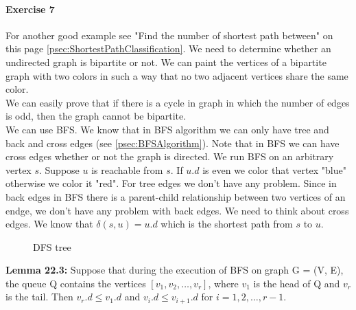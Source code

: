 \documentclass{book}
\begin{document}
    \label{psec:bfs_exercise_7}
	\paragraph{Exercise 7}
	For another good example see "Find the number of shortest path between" on this page \ref{psec:ShortestPathClassification}. We need to determine whether an undirected graph is bipartite or not. We can paint the vertices of a bipartite graph with two colors in such a way that no two adjacent vertices share the same color.\\
	We can easily prove that if there is a cycle in graph in which the number of edges is odd, then the graph cannot be bipartite. \\
	We can use BFS. We know that in BFS algorithm we can only have tree and back and cross edges (see \ref{psec:BFSAlgorithm}). Note that in BFS we can have cross edges whether or not the graph is directed. We run BFS on an arbitrary vertex $s$. Suppose $u$ is reachable from $s$. If $u.d$ is even we color that vertex "blue" otherwise we color it "red". For tree edges we don't have any problem. Since in back edges in BFS there is a parent-child relationship between two vertices of an endge, we don't have any problem with back edges. We need to think about cross edges. We know that $\delta(s, u) = u.d$ which is the shortest path from $s$ to $u$. \\
	
			\begin{figure}[h!]
				\centering
				\caption{DFS tree}
				\label{fig:DFS tree}
			\end{figure}
			
	\textbf{Lemma 22.3: } Suppose that during the execution of BFS on graph G = (V, E), the queue Q contains the vertices $[v_1, v_2, \dots , v_r]$, where $v_1$ is the head of Q and $v_r$ is the tail. Then $v_r.d \le v_1.d$ and $v_i.d \le v_{i+1}.d$ for $i = 1, 2, \dots, r - 1$.\\
	
\end{document}
